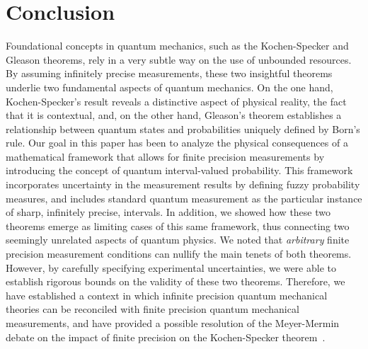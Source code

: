 \documentclass[english,reprint, aps, prl,superscriptaddress, showpacs,
showkeys, longbibliography, amsmath, amssymb]{revtex4-1}
\theoremstyle{plain}
\theoremstyle{definition}
\begin{document}
\section{Conclusion}
\label{sec:Conclusion}
  
Foundational concepts in quantum mechanics, such as the Kochen-Specker
and Gleason theorems, rely in a very subtle way on the use of
unbounded resources. By assuming infinitely precise measurements,
these two insightful theorems underlie two fundamental aspects of
quantum mechanics. On the one hand, Kochen-Specker's result reveals a
distinctive aspect of physical reality, the fact that it is
contextual, and, on the other hand, Gleason's theorem establishes a
relationship between quantum states and probabilities uniquely defined
by Born's rule.  Our goal in this paper has been to analyze the
physical consequences of a mathematical framework that allows for
finite precision measurements by introducing the concept of quantum
interval-valued probability. This framework incorporates uncertainty
in the measurement results by defining fuzzy probability measures, and
includes standard quantum measurement as the particular instance of
sharp, infinitely precise, intervals.  In addition, we showed how
these two theorems emerge as limiting cases of this same framework,
thus connecting two seemingly unrelated aspects of quantum physics. We
noted that {\it arbitrary\/} finite precision measurement conditions
can nullify the main tenets of both theorems. However, by carefully
specifying experimental uncertainties, we were able to establish
rigorous bounds on the validity of these two theorems. Therefore, we
have established a context in which infinite precision quantum
mechanical theories can be reconciled with finite precision quantum
mechanical measurements, and have provided a possible resolution of
the Meyer-Mermin debate on the impact of finite precision on the
Kochen-Specker theorem~\cite{PhysRevLett.83.3751,Mermin1999}.



\end{document}
